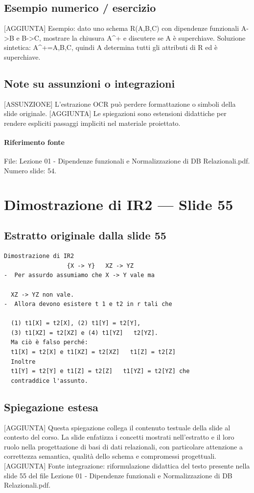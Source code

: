 \documentclass[11pt]{article}
\begin{document}
\subsection*{Esempio numerico / esercizio}
[AGGIUNTA] Esempio: dato uno schema R(A,B,C) con dipendenze funzionali A->B e B->C, mostrare la chiusura A^+ e discutere se A è superchiave. Soluzione sintetica: A^+={A,B,C}, quindi A determina tutti gli attributi di R ed è superchiave.
\subsection*{Note su assunzioni o integrazioni}
[ASSUNZIONE] L'estrazione OCR può perdere formattazione o simboli della slide originale.
[AGGIUNTA] Le spiegazioni sono estensioni didattiche per rendere espliciti passaggi impliciti nel materiale proiettato.
\paragraph{Riferimento fonte} File: Lezione 01 - Dipendenze funzionali e Normalizzazione di DB Relazionali.pdf. Numero slide: 54.
\section{Dimostrazione di IR2 --- Slide 55}
\subsection*{Estratto originale dalla slide 55}
\begin{lstlisting}
Dimostrazione di IR2
                  {X -> Y}   XZ -> YZ
-  Per assurdo assumiamo che X -> Y vale ma

  XZ -> YZ non vale.
-  Allora devono esistere t 1 e t2 in r tali che

  (1) t1[X] = t2[X], (2) t1[Y] = t2[Y],
  (3) t1[XZ] = t2[XZ] e (4) t1[YZ]   t2[YZ].
  Ma ciò è falso perché:
  t1[X] = t2[X] e t1[XZ] = t2[XZ]   t1[Z] = t2[Z]
  Inoltre
  t1[Y] = t2[Y] e t1[Z] = t2[Z]   t1[YZ] = t2[YZ] che
  contraddice l'assunto.
\end{lstlisting}
\subsection*{Spiegazione estesa}
[AGGIUNTA] Questa spiegazione collega il contenuto testuale della slide al contesto del corso. La slide enfatizza i concetti mostrati nell'estratto e il loro ruolo nella progettazione di basi di dati relazionali, con particolare attenzione a correttezza semantica, qualità dello schema e compromessi progettuali.
[AGGIUNTA] Fonte integrazione: riformulazione didattica del testo presente nella slide 55 del file Lezione 01 - Dipendenze funzionali e Normalizzazione di DB Relazionali.pdf.
\end{document}
